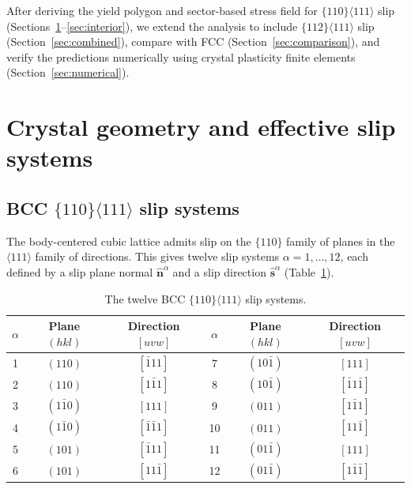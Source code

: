 \documentclass{svjour3} %
\newcommand{\bn}{\hat{\mathbf{n}}}
\newcommand{\bs}{\hat{\mathbf{s}}}
\begin{document}
After deriving the yield polygon and sector-based stress field for
$\{110\}\langle 111\rangle$ slip
(Sections~\ref{sec:crystal}--\ref{sec:interior}), we extend the
analysis to include $\{112\}\langle 111\rangle$ slip
(Section~\ref{sec:combined}), compare with FCC
(Section~\ref{sec:comparison}), and verify the predictions numerically
using crystal plasticity finite elements (Section~\ref{sec:numerical}).

\section{Crystal geometry and effective slip systems}
\label{sec:crystal}

\subsection{BCC $\{110\}\langle 111\rangle$ slip systems}

The body-centered cubic lattice admits slip on the $\{110\}$ family of
planes in the $\langle 111\rangle$ family of directions. This gives twelve
slip systems $\alpha = 1, \ldots, 12$, each defined by a slip plane normal
$\bn^\alpha$ and a slip direction $\bs^\alpha$ (Table~\ref{tab:slip}).

\begin{table}[htb]
\caption{The twelve BCC $\{110\}\langle 111\rangle$ slip systems.}
\label{tab:slip}
\centering
\begin{tabular}{ccc|ccc}
\toprule
$\alpha$ & Plane $(hkl)$ & Direction $[uvw]$ &
$\alpha$ & Plane $(hkl)$ & Direction $[uvw]$ \\
\midrule
1  & $(110)$         & $[\bar{1}11]$        & 7  & $(10\bar{1})$   & $[111]$ \\
2  & $(110)$         & $[1\bar{1}1]$        & 8  & $(10\bar{1})$   & $[\bar{1}1\bar{1}]$ \\
3  & $(1\bar{1}0)$   & $[111]$              & 9  & $(011)$         & $[1\bar{1}1]$ \\
4  & $(1\bar{1}0)$   & $[\bar{1}\bar{1}1]$  & 10 & $(011)$         & $[11\bar{1}]$ \\
5  & $(101)$         & $[\bar{1}11]$        & 11 & $(01\bar{1})$   & $[111]$ \\
6  & $(101)$         & $[11\bar{1}]$        & 12 & $(01\bar{1})$   & $[1\bar{1}\bar{1}]$ \\
\bottomrule
\end{tabular}
\end{table}
\end{document}
